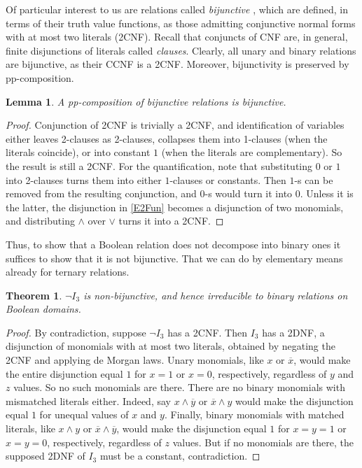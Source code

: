 \documentclass[11pt]{article}
\theoremstyle{plain}
\newtheorem{theorem}{Theorem}
\newtheorem{lemma}{Lemma}
\theoremstyle{definition}
\begin{document}
Of particular interest to us are relations called {\it bijunctive} \cite{CreVol08, Sch78}, which are defined, in terms of their truth value functions, as those admitting conjunctive normal forms with at most two literals (2CNF). Recall that conjuncts of CNF are, in general, finite disjunctions of literals called {\it clauses}. Clearly, all unary and binary relations are bijunctive, as their CCNF is a 2CNF. Moreover, bijunctivity is preserved by pp-composition. 
\begin{lemma}\label{BijComp}
A pp-composition of bijunctive relations is bijunctive.
\end{lemma}
\begin{proof}
Conjunction of 2CNF is trivially a 2CNF, and identification of variables either leaves 2-clauses as 2-clauses, collapses them into 1-clauses (when the literals coincide), or into constant $1$ (when the literals are complementary). So the result is still a 2CNF. For the quantification, note that substituting $0$ or $1$ into 2-clauses turns them into either $1$-clauses or constants. Then $1$-s can be removed from the resulting conjunction, and $0$-s would turn it into $0$. Unless it is the latter, the disjunction in \eqref{E2Fun} becomes a disjunction of two monomials, and distributing $\land$ over $\lor$ turns it into a 2CNF. 
\end{proof}
Thus, to show that a Boolean relation does not decompose into binary ones it suffices to show that it is not bijunctive. That we can do by elementary means already for ternary relations.
\begin{theorem}
$\neg I_3$ is non-bijunctive, and hence irreducible to binary relations on Boolean domains.
\end{theorem}
\begin{proof}
By contradiction, suppose $\neg I_3$ has a 2CNF. Then $I_3$ has a 2DNF, a disjunction of monomials with at most two literals, obtained by negating the 2CNF and applying de Morgan laws. Unary monomials, like $x$ or $\overline{x}$, would make the entire disjunction equal $1$ for $x=1$ or $x=0$, respectively, regardless of $y$ and $z$ values. So no such monomials are there. There are no binary monomials with mismatched literals either. Indeed, say $x\land\overline{y}$ or $\overline{x}\land y$ would make the disjunction equal $1$ for unequal values of $x$ and $y$. Finally, binary monomials with matched literals, like $x\land y$ or $\overline{x}\land\overline{y}$, would make the disjunction equal $1$ for $x=y=1$ or $x=y=0$, respectively, regardless of $z$ values. But if no monomials are there, the supposed 2DNF of $I_3$ must be a constant, contradiction.
\end{proof}
\end{document}
